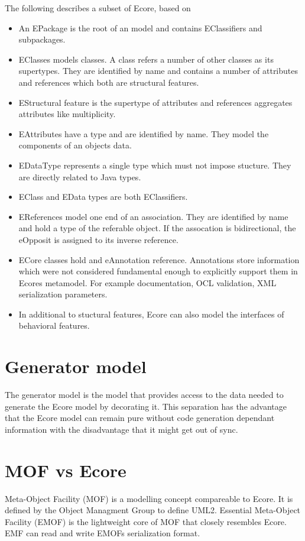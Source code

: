 The following describes a subset of Ecore, based on \cite{EMF2nd} \\



\begin{itemize}
	\item An EPackage is the root of an model and contains EClassifiers and subpackages.
	\item EClasses models classes. A class refers a number of other classes as its supertypes. They are identified by name and contains a number of attributes and references which both are structural features.
	\item EStructural feature is the supertype of attributes and references aggregates attributes like multiplicity.
	\item EAttributes have a type and are identified by name. They model the components of an objects data.
	\item EDataType represents a single type which must not impose stucture. They are directly related to Java types.
	\item EClass and EData types are both EClassifiers.
	\item EReferences model one end of an association. They are identified by name and hold a type of the referable object. If the assocation is bidirectional, the eOpposit is assigned to its inverse reference. \cite{EMF2nd}
	\item ECore classes hold and eAnnotation reference. Annotations store information which were not considered fundamental enough to explicitly support them in Ecores metamodel. For example documentation, OCL validation, XML serialization parameters. \cite{EMP}
	\item In additional to stuctural features, Ecore can also model the interfaces of behavioral features.
\end{itemize}

\section{Generator model}
The generator model is the model that provides access to the data needed to generate the Ecore model by decorating it. This separation has the advantage that the Ecore model can remain pure without code generation dependant information with the disadvantage that it might get out of sync. \cite{EMF2nd}

\section{MOF vs Ecore}
Meta-Object Facility (MOF) is a modelling concept compareable to Ecore. It is defined by the Object Managment Group \cite{OMG} to define UML2. Essential Meta-Object Facility (EMOF) is the lightweight core of MOF that closely resembles Ecore. EMF can read and write EMOFs serialization format. \cite{EMP}

